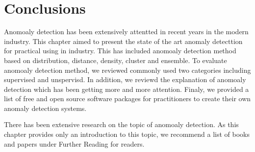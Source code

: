 \section{Conclusions} \label{sec-conclusions}

Anomoaly detection has been extensively
attentted in recent years in the modern industry.
This chapter aimed to present the state of the art 
anomaly detecttion for practical using in industry.
This has included anomoaly detection method based on distribution, 
distance,
density,
cluster and ensemble.
To evaluate anomoaly detection method,
we reviewed commonly used 
two categories including supervised and unspervisd.
In addition,
we reviewd the explanation of anomoaly detection which
has been getting more and more attention. 
Finaly,
we provided a list of free and open source software packages for
practitioners to create their own anomaly detection systems.


There has been extensive research on the topic of anomoaly detection.
As this chapter provides only an introduction to this
topic,
we recommend a list of books and 
papers under Further Reading for readers.







